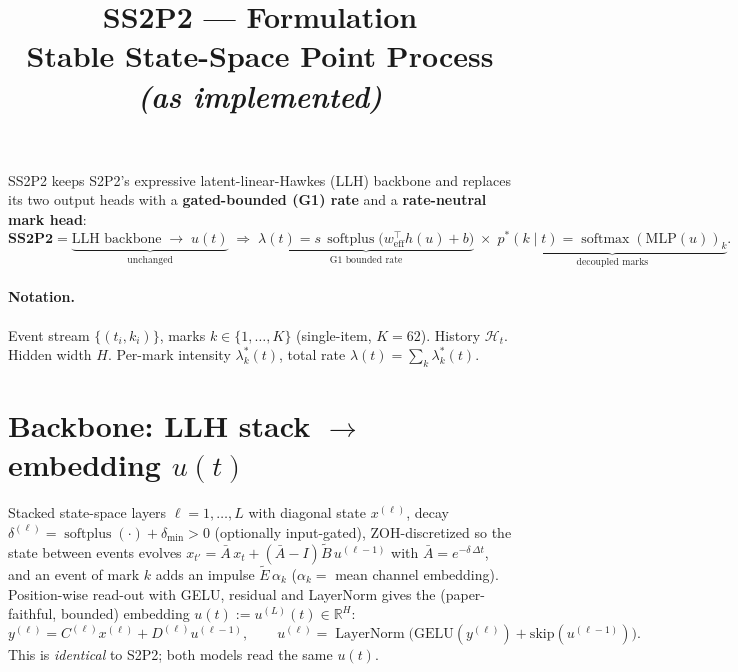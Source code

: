 \documentclass[11pt]{article}
\title{\textbf{SS2P2 — Formulation}\\[2pt]
\large Stable State-Space Point Process \emph{(as implemented)}}
\author{}\date{}
\newcommand{\R}{\mathbb{R}}
\newcommand{\softplus}{\operatorname{softplus}}
\newcommand{\softmax}{\operatorname{softmax}}
\newcommand{\LN}{\operatorname{LayerNorm}}
\begin{document}
\maketitle\vspace{-3em}

\noindent SS2P2 keeps S2P2's expressive latent-linear-Hawkes (LLH) backbone and replaces its two
output heads with a \textbf{gated-bounded (G1) rate} and a \textbf{rate-neutral mark head}:
\[
\textbf{SS2P2}=\underbrace{\text{LLH backbone}\;\to\;u(t)}_{\text{unchanged}}
\;\Longrightarrow\;
\underbrace{\lambda(t)=s\,\softplus\!\bigl(w_{\mathrm{eff}}^\top h(u)+b\bigr)}_{\text{G1 bounded rate}}
\;\times\;
\underbrace{p^*(k\mid t)=\softmax(\mathrm{MLP}(u))_k}_{\text{decoupled marks}} .
\]

\paragraph{Notation.} Event stream $\{(t_i,k_i)\}$, marks $k\in\{1,\dots,K\}$ (single-item, $K{=}62$).
History $\mathcal H_t$. Hidden width $H$. Per-mark intensity $\lambda^*_k(t)$, total rate
$\lambda(t)=\sum_k\lambda^*_k(t)$.

\section{Backbone: LLH stack $\to$ embedding $u(t)$}
Stacked state-space layers $\ell=1,\dots,L$ with diagonal state $x^{(\ell)}$, decay
$\delta^{(\ell)}=\softplus(\cdot)+\delta_{\min}>0$ (optionally input-gated), ZOH-discretized so the
state between events evolves $x_{t'}=\bar A\,x_t+(\bar A-I)\tilde B\,u^{(\ell-1)}$ with
$\bar A=e^{-\delta\,\Delta t}$, and an event of mark $k$ adds an impulse $\tilde E\,\alpha_k$
($\alpha_k=$ mean channel embedding). Position-wise read-out with GELU, residual and LayerNorm gives
the (paper-faithful, bounded) embedding $u(t):=u^{(L)}(t)\in\R^{H}$:
\[
y^{(\ell)}=C^{(\ell)}x^{(\ell)}+D^{(\ell)}u^{(\ell-1)},\qquad
u^{(\ell)}=\LN\!\bigl(\mathrm{GELU}(y^{(\ell)})+\text{skip}(u^{(\ell-1)})\bigr).
\]
This is \emph{identical} to S2P2; both models read the same $u(t)$.
\end{document}
